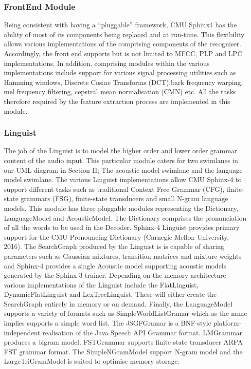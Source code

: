 \subsubsection{FrontEnd Module}
Being consistent with having a “pluggable” framework, CMU Sphinx4 has the ability of most of its components being replaced and at run-time.  This flexibility allows various implementations of the comprising components of the recogniser.  Accordingly, the front end supports but is not limited to MFCC, PLP and LPC implementations.  In addition, comprising modules within the various implementations include support for various signal processing utilities such as Hamming windows, Discrete Cosine Transforms (DCT),bark frequency warping, mel frequency filtering, cepstral mean normalisation (CMN) etc.  All the tasks therefore required by the feature extraction process are implemented in this module.
\subsubsection{Linguist}
The job of the Linguist is to model the higher order and lower order grammar content of the audio input.  This particular module caters for two swimlanes in our UML diagram in Section II;  The acoustic model swimlane and the language model swimlane.  The  various Linguist implementations allow CMU Sphinx-4 to support different tasks such as traditional Context Free Grammar (CFG), finite-state grammars (FSG), finite-state transducers and small N-gram language models.  This module has three pluggable modules representing the Dictionary, LanguageModel and AcousticModel.  The Dictionary comprises the pronunciation of all the words to be used in the Decoder. Sphinx-4 Linguist provides primary support for the CMU Pronouncing Dictionary (Carnegie Mellon University, 2016). The SearchGraph produced by the Linguist is is capable of sharing parameters such as Gaussian mixtures, transition matrices and mixture weights and Sphinx-4 provides a single Acoustic model supporting acoustic models generated by the Sphinx-3 trainer.  Depending on the memory architecture various implementations of the Linguist include the FlatLinguist, DynamicFlatLinguist and LexTreeLinguist.  These will either create the SearchGraph entirely in memory or on demand.  Finally, the LanguageModel supports a variety of formats such as SimpleWorldListGramar which as the name implies supports a simple word list.  The JSGFGramar is a BNF-style platform-independent realisation of the Java Speech API Grammar format. LMGrammar produces a bigram model. FSTGrammar supports finite-state transducer ARPA FST grammar format. The SimpleNGramModel support N-gram model and the LargeTriGramModel is suited to optimise memory storage.

